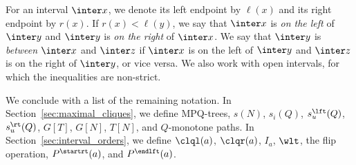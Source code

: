 For an interval $\inter x$, we denote its left endpoint by $\ell(x)$ and its right endpoint by
$r(x)$. If $r(x) < \ell(y)$, we say that $\inter x$ is \emph{on the left} of $\inter y$ and $\inter
y$ is \emph{on the right} of $\inter x$. We say that $\inter y$ is \emph{between} $\inter x$ and
$\inter z$ if $\inter x$ is on the left of $\inter y$ and $\inter z$ is on the right of $\inter y$,
or vice versa. We also work with open intervals, for which the inequalities are non-strict.

We conclude with a list of the remaining notation.  In Section~\ref{sec:maximal_cliques}, we define
MPQ-trees, $s(N)$, $s_i(Q)$, $s^{\lft}_u(Q)$, $s^{\rt}_u(Q)$, $G[T]$, $G[N]$, $T[N]$, and
$Q$-monotone paths. In Section~\ref{sec:interval_orders}, we define $\clql(a)$, $\clqr(a)$, $I_a$,
$\wlt$, the flip operation, $P^{\startrt}(a)$, and $P^{\endlft}(a)$.
